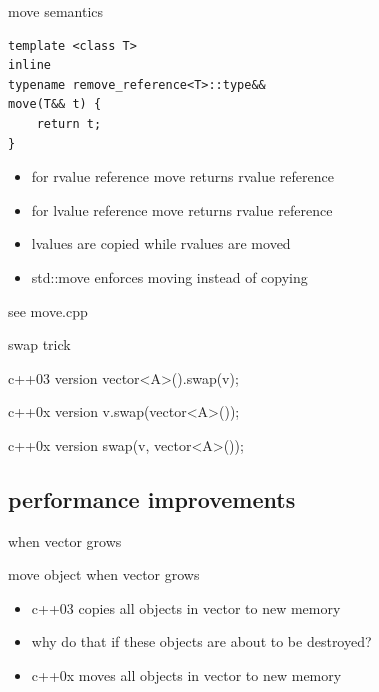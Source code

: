 \documentclass{beamer}
\begin{document}
\begin{frame}{move semantics}
\begin{verbatim}
template <class T>
inline
typename remove_reference<T>::type&&
move(T&& t) {
    return t;
}
\end{verbatim}
\begin{block}
  \begin{itemize}
  \item for rvalue reference move returns rvalue reference
  \item for lvalue reference move returns rvalue reference
  \item lvalues are copied while rvalues are moved
  \item std::move enforces moving instead of copying
  \end{itemize}
\end{block}
  see move.cpp
\end{frame}

\begin{frame}{swap trick}
  \begin{block}{c++03 version}
    vector<A>().swap(v);
  \end{block}

  \begin{block}{c++0x version}
    v.swap(vector<A>());
  \end{block}

  \begin{block}{c++0x version}
    swap(v, vector<A>());
  \end{block}
\end{frame}

\subsection{performance improvements}
\begin{frame}{when vector grows}
  \begin{block}{move object when vector grows}
    \begin{itemize}
    \item c++03 copies all objects in vector to new memory
    \item why do that if these objects are about to be destroyed?
    \item c++0x moves all objects in vector to new memory
    \end{itemize}
  \end{block}
\end{frame}
\end{document}
